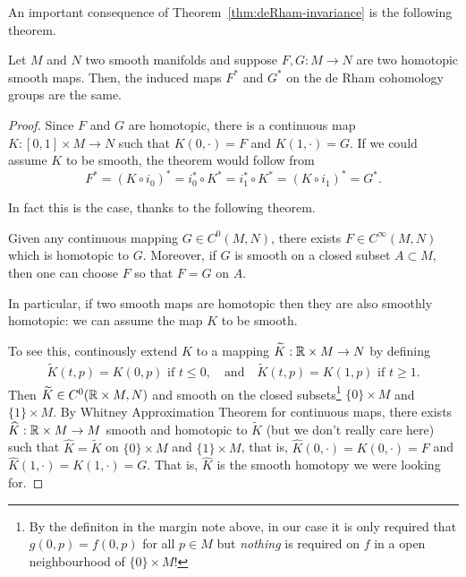 An important consequence of Theorem~\ref{thm:deRham-invariance} is the following theorem.

\begin{theorem}
  Let $M$ and $N$ two smooth manifolds and suppose $F,G: M\to N$ are two homotopic smooth maps.
  Then, the induced maps $F^*$ and $G^*$ on the de Rham cohomology groups are the same.
\end{theorem}
\begin{proof}
  Since $F$ and $G$ are homotopic, there is a continuous map $K: [0,1]\times M \to N$ such that $K(0,\cdot) = F$ and $K(1,\cdot) = G$.
  If we could assume $K$ to be smooth, the theorem would follow from
  \begin{equation}
    F^* = (K\circ i_0)^* = i_0^*\circ K^* = i_1^*\circ K^* = (K\circ i_1)^* = G^*.
  \end{equation}

  In fact this is the case, thanks to the following theorem.
  \begin{theorem}\label{thm:WhitneyApproxCont}
    Given any continuous mapping $G \in C^0(M,N)$, there exists $F \in C^\infty(M,N)$ which is homotopic to $G$. Moreover, if $G$ is smooth on a closed subset $A\subset M$, then one can choose $F$ so that $F=G$ on $A$.
  \end{theorem}
  In particular, if two smooth maps are homotopic then they are also smoothly homotopic: we can assume the map $K$ to be smooth.

  To see this, continously extend $K$ to a mapping $\widetilde K : \mathbb{R} \times M \to N$ by defining
  \begin{align}
    \widetilde K(t, p) = K(0, p) \mbox{ if } t \leq 0,
    \quad\mbox{and}\quad \widetilde K(t, p) = K(1, p) \mbox{ if } t \geq 1.
  \end{align}
  Then $\widetilde K \in C^0(\mathbb{R}\times M, N)$ and smooth on the closed subsets\footnote{By the definiton in the margin note above, in our case it is only required that $g(0, p) = f(0,p)$ for all $p\in M$ but \emph{nothing} is required on $f$ in a open neighbourhood of $\{0\}\times M$!} $\{0\}\times M$ and $\{1\}\times M$.
  By Whitney Approximation Theorem for continuous maps, there exists $\widehat K : \mathbb{R}\times M \to M$ smooth and homotopic to $\widetilde K$ (but we don't really care here) such that $\widehat K = \widetilde K$ on $\{0\}\times M$ and $\{1\}\times M$, that is, $\widehat K(0, \cdot) = K(0, \cdot) = F$ and $\widehat K(1, \cdot) = K(1, \cdot) = G$.
  That is, $\hat K$ is the smooth homotopy we were looking for.
\end{proof}

